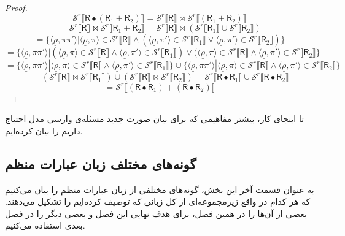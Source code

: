 \begin{proof}
	$$\mathcal{S}^r \llbracket \mathsf{R}\bullet (\mathsf{R}_1 + \mathsf{R}_2) \rrbracket =\mathcal{S}^r \llbracket \mathsf{R} \rrbracket \Join \mathcal{S}^r \llbracket (\mathsf{R}_1+\mathsf{R}_2) \rrbracket$$
	$$=\mathcal{S}^r \llbracket \mathsf{R} \rrbracket \Join \mathcal{S}^r \llbracket \mathsf{R}_1+\mathsf{R}_2 \rrbracket=\mathcal{S}^r \llbracket \mathsf{R} \rrbracket \Join (\mathcal{S}^r \llbracket \mathsf{R}_1 \rrbracket \cup \mathcal{S}^r\llbracket \mathsf{R}_2 \rrbracket)$$
	$$= \{ \langle \underline{\rho}, \pi \pi' \rangle| \langle \underline{\rho}, \pi \rangle \in \mathcal{S}^r \llbracket \mathsf{R} \rrbracket \land (\langle \underline{\rho},\pi'\rangle \in \mathcal{S}^r \llbracket \mathsf{R}_1 \rrbracket\lor \langle \underline{\rho} , \pi' \rangle \in \mathcal{S}^r \llbracket \mathsf{R}_2 \rrbracket) \}$$
	$$=\{ \langle \underline{\rho}, \pi \pi' \rangle| (\langle \underline{\rho}, \pi \rangle \in \mathcal{S}^r \llbracket \mathsf{R} \rrbracket \land \langle \underline{\rho},\pi'\rangle \in \mathcal{S}^r \llbracket \mathsf{R}_1 \rrbracket) \lor (\langle \underline{\rho}, \pi \rangle \in \mathcal{S}^r \llbracket \mathsf{R} \rrbracket \land \langle \underline{\rho} , \pi' \rangle \in \mathcal{S}^r \llbracket \mathsf{R}_2 \rrbracket  \}$$
	$$=\{ \langle \underline{\rho}, \pi \pi' \rangle|\langle \underline{\rho}, \pi \rangle \in \mathcal{S}^r \llbracket \mathsf{R} \rrbracket \land \langle \underline{\rho},\pi'\rangle \in \mathcal{S}^r \llbracket \mathsf{R}_1 \rrbracket\} \cup
	\{ \langle \underline{\rho}, \pi \pi' \rangle|\langle \underline{\rho}, \pi \rangle \in \mathcal{S}^r \llbracket \mathsf{R} \rrbracket \land \langle \underline{\rho},\pi'\rangle \in \mathcal{S}^r \llbracket \mathsf{R}_2 \rrbracket\}$$
	$$=(\mathcal{S}^r \llbracket \mathsf{R} \rrbracket \Join \mathcal{S}^r \llbracket \mathsf{R}_1\rrbracket ) \cup (\mathcal{S}^r \llbracket \mathsf{R} \rrbracket \Join \mathcal{S}^r \llbracket \mathsf{R}_2 \rrbracket)=
	\mathcal{S}^r \llbracket \mathsf{R\bullet R}_1 \rrbracket \cup \mathcal{S}^r \llbracket \mathsf{R\bullet R}_2 \rrbracket$$
	$$=\mathcal{S}^r \llbracket (\mathsf{R \bullet R}_1) + (\mathsf{R \bullet R}_2) \rrbracket $$
\end{proof}
تا اینجای کار، بیشتر مفاهیمی که برای بیان صورت جدید مسئله‌ی وارسی مدل احتیاج داریم را بیان کرده‌ایم. 
\subsection{گونه‌های مختلف زبان عبارات منظم}
به عنوان قسمت آخر این بخش، گونه‌های مختلفی از زبان عبارات منظم را بیان می‌کنیم که هر کدام در واقع زیرمجموعه‌ای از کل زبانی که توصیف کرده‌ایم را تشکیل می‌دهند. بعضی از آن‌ها را در همین فصل، برای هدف نهایی این فصل و بعضی دیگر را در فصل بعدی استفاده می‌کنیم.

